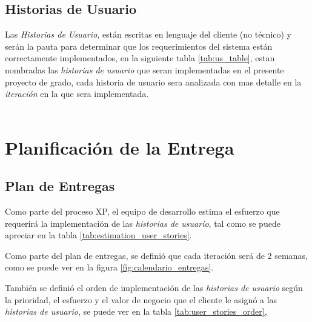   \subsection{Historias de Usuario}
  \label{sub:historias_de_usuario}

    Las \emph{Historias de Usuario}, están escritas en lenguaje del cliente (no técnico) y serán la pauta para  determinar que los requerimientos del sistema están correctamente implementados, en la siguiente tabla \ref{tab:us_table}, estan nombradas las \emph{historias de usuario} que seran implementadas en el presente proyecto de grado, cada historia de usuario sera analizada con mas detalle en la \emph{iteración} en la que sera implementada. \\

    



\\
  \section{Planificación de la Entrega}
  \label{sub:Planificación de la Entrega}


  \subsection{Plan de Entregas}

  Como parte del proceso XP, el equipo de desarrollo estima el esfuerzo que requerirá la implementación de las \emph{historias de usuario}, tal como se puede apreciar en la tabla \ref{tab:estimation_user_stories}.




    Como parte del plan de entregas, se definió que cada iteración será de 2 semanas, como se puede ver en la figura \ref{fig:calendario_entregas}.




       También se definió el orden de implementación de las  \emph{historias de usuario} según la  prioridad, el esfuerzo y el valor de negocio que el cliente le asignó a las \emph{historias de usuario}, se puede ver en la tabla \ref{tab:user_stories_order},

